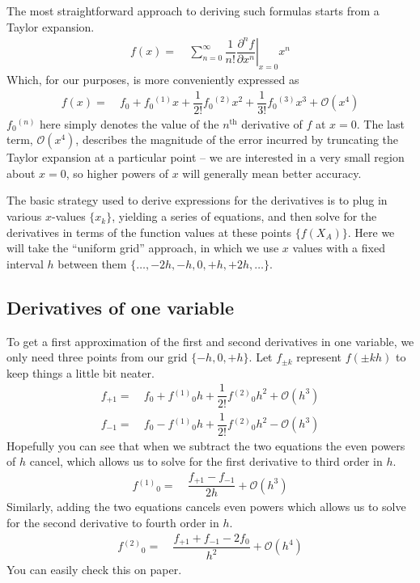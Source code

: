 \documentclass[11pt]{article}
\newcommand{\fr}[2]{\dfrac{#1}{#2}}
\newcommand{\ord}[1]{\ensuremath{^{(#1)}}}
\newcommand{\pd}[3]{\ensuremath{ \dfrac{ \partial^{#1} #2 }{\partial #3 ^{#1}}}}
\newcommand{\bigo}{\ensuremath{\mathcal{O}}}
\newcommand{\eth}{\ensuremath{^\text{th}}}
\newcommand{\ld}{\ensuremath{\ldots}}
\begin{document}
The most straightforward approach to deriving such formulas starts from a Taylor expansion.
\begin{align}
	f(x) 
	=&\
	\sum_{n=0}^\infty \fr{1}{n!}
	\left.\pd{n}{f}{x}\right|_{x=0} x^n
\end{align}
Which, for our purposes, is more conveniently expressed as
\begin{align}
	f(x) =&\
  	f_0 + f_0\ord{1}x + \fr{1}{2!}f_0\ord{2}x^2
  	+ \fr{1}{3!}f_0\ord{3}x^3 + \bigo(x^4)
\end{align}
$f_0\ord{n}$ here simply denotes the value of the $n\eth$ derivative of $f$ at $x=0$.
The last term, $\bigo(x^4)$, describes the magnitude of the error incurred by truncating the Taylor expansion at a particular point -- we are interested in a very small region about $x=0$, so higher powers of $x$ will generally mean better accuracy.

The basic strategy used to derive expressions for the derivatives is to plug in various $x$-values $\{x_k\}$, yielding a series of equations, and then solve for the derivatives in terms of the function values at these points $\{f(X_A)\}$.
Here we will take the ``uniform grid'' approach, in which we use $x$ values with a fixed interval $h$ between them $\{\ld,-2h,-h,0,+h,+2h,\ld\}$.

\subsection{Derivatives of one variable}
To get a first approximation of the first and second derivatives in one variable, we only need three points from our grid $\{-h,0,+h\}$.
Let $f_{\pm k}$ represent $f(\pm kh)$ to keep things a little bit neater.
\begin{align*}
	f_{+1} =&\
	f_0 + f\ord{1}_0 h + \fr{1}{2!}f\ord{2}_0 h^2
	+\bigo(h^3)\\
	f_{-1} =&\
	f_0 - f\ord{1}_0 h + \fr{1}{2!}f\ord{2}_0 h^2
	-\bigo(h^3)
\end{align*}
Hopefully you can see that when we subtract the two equations the even powers of $h$ cancel, which allows us to solve for the first derivative to third order in $h$.
\begin{align*}
	f\ord{1}_0 =&\ \fr{f_{+1}-f_{-1}}{2h} +\bigo(h^3)
\end{align*}
Similarly, adding the two equations cancels even powers which allows us to solve for the second derivative to fourth order in $h$.
\begin{align*}
	f\ord{2}_0 =&\ \fr{f_{+1}+f_{-1}-2f_0}{h^2} +\bigo(h^4)
\end{align*}
You can easily check this on paper.
\end{document}
